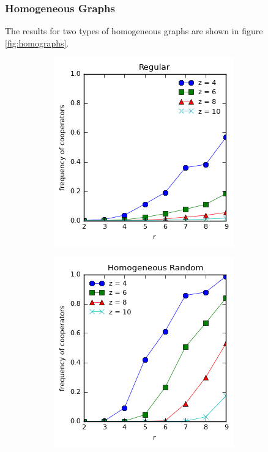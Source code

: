 \documentclass{article}
\begin{document}
	\subsubsection{Homogeneous Graphs}
	The results for two types of homogeneous graphs are shown in figure \ref{fig:homographs}.

	\begin{figure}[h]
		\centering
		\begin{subfigure}[b]{0.4\textwidth}
			\includegraphics[width=\textwidth]{fig/fixed/regular.png}
			\caption{}
		\end{subfigure}
		\begin{subfigure}[b]{0.4\textwidth}
			\includegraphics[width=\textwidth]{fig/fixed/homorand.png}

\end{subfigure}
\end{figure}
\end{document}
